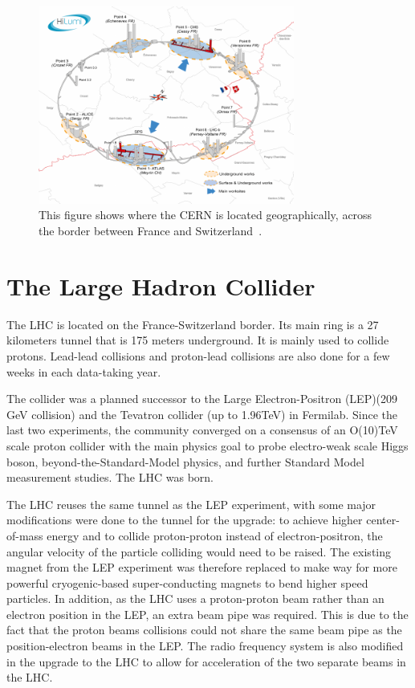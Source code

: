 \begin{figure}[!htb]
    \begin{center}
        \includegraphics[width=0.75\textwidth]{figures/chapter_ATLAS/LHCOnBorder}
        \caption{
            This figure shows where the CERN is located geographically, across the border between France and Switzerland~\cite{Bruning:782076}.
        }
        \label{fig:LHCOnBorder}
    \end{center}
\end{figure}

\section{The Large Hadron Collider}
\label{LHC}

The LHC is located on the France-Switzerland border. Its main ring is a 27 kilometers tunnel that is 175 meters underground. It is mainly used to collide protons. Lead-lead collisions and proton-lead collisions are also done for a few weeks in each data-taking year. 

The collider was a planned successor to the Large Electron-Positron (LEP)(209 GeV collision) and the Tevatron collider (up to 1.96TeV) in Fermilab. Since the last two experiments, the community converged on a consensus of an O(10)TeV scale proton collider with the main physics goal to probe electro-weak scale Higgs boson, beyond-the-Standard-Model physics, and further Standard Model measurement studies. The LHC was born.

The LHC reuses the same tunnel as the LEP experiment, with some major modifications were done to the tunnel for the upgrade: to achieve higher center-of-mass energy and to collide proton-proton instead of electron-positron, the angular velocity of the particle colliding would need to be raised. The existing magnet from the LEP experiment was therefore replaced to make way for more powerful cryogenic-based super-conducting magnets to bend higher speed particles. In addition, as the LHC uses a proton-proton beam rather than an electron position in the LEP, an extra beam pipe was required. This is due to the fact that the proton beams collisions could not share the same beam pipe as the position-electron beams in the LEP. The radio frequency system is also modified in the upgrade to the LHC to allow for acceleration of the two separate beams in the LHC.

